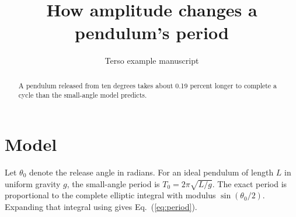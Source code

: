 \documentclass{article}
\title{How amplitude changes a pendulum's period}
\author{Terso example manuscript}
\date{}
\begin{document}
\maketitle
\begin{abstract}
A pendulum released from ten degrees takes about 0.19 percent longer to
complete a cycle than the small-angle model predicts.
\end{abstract}

\section{Model}
Let $\theta_0$ denote the release angle in radians. For an ideal pendulum of
length $L$ in uniform gravity $g$, the small-angle period is
$T_0=2\pi\sqrt{L/g}$. The exact period is proportional to the complete
elliptic integral with modulus $\sin(\theta_0/2)$. Expanding that integral
using \cite{dlmf19} gives Eq.~(\ref{eq:period}).





\end{document}
